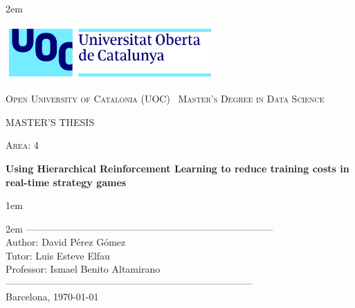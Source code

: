\newpage
\thispagestyle{empty}

\baselineskip 2em


\centerline{\includegraphics[width=0.6\textwidth]{images/UOC-logo}}
\begin{center}
\textsc{Open University of Catalonia (UOC) \
Master's Degree in Data Science \
}


\vspace*{1.5cm}

\textsc{\Large MASTER'S THESIS}

\vspace*{0.5cm}

\textsc{\large Area: 4}


\vspace*{2.0cm}

\textbf{\Large Using Hierarchical Reinforcement Learning to reduce training costs in real-time strategy games}


\vspace{2.5cm}
\baselineskip 1em

\baselineskip 2em
-----------------------------------------------------------------------------\\
Author: David Pérez Gómez\\
Tutor: Luis Esteve Elfau\\
Professor: Ismael Benito Altamirano\\
-----------------------------------------------------------------------------\\
\vspace*{1.5cm}
Barcelona, \today

\end{center}

\newpage
\pagestyle{empty}
\hfill